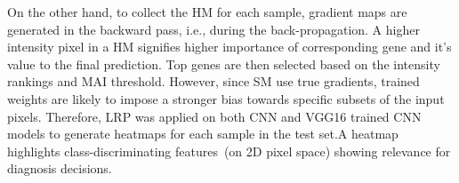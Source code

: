 \hspace*{3.5mm} On the other hand, to collect the HM for each sample, gradient maps are generated in the backward pass, i.e., during the back-propagation. A higher intensity pixel in a HM signifies higher importance of corresponding gene and it's value to the final prediction. Top genes are then selected based on the intensity rankings and MAI threshold. However, since SM use true gradients, trained weights are likely to impose a stronger bias towards specific subsets of the input pixels. Therefore, LRP was applied on both CNN and VGG16 trained CNN models to generate heatmaps for each sample in the test set.A heatmap highlights class-discriminating features~(on 2D pixel space) showing relevance for diagnosis decisions. 

\begin{algorithm*}[h]
\small
    \DontPrintSemicolon {}%
      \BlankLine%
\end{algorithm*}

